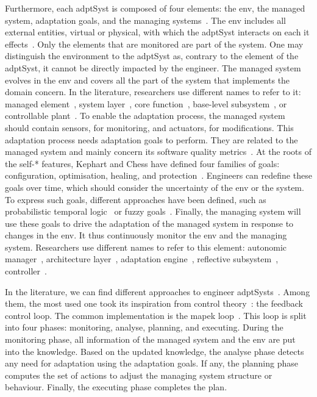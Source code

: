 Furthermore, each \gls{adptSyst} is composed of four elements: the \gls{env}, the managed system, adaptation goals, and the managing systems~\cite{DBLP:books/sp/19/Weyns19}.
The \gls{env} includes all external entities, virtual or physical, with which the \gls{adptSyst} interacts on each it effects~\cite{DBLP:journals/ansoft/Jackson97}.
Only the elements that are monitored are part of the system.
One may distinguish the environment to the \gls{adptSyst} as, contrary to the element of the \gls{adptSyst}, it cannot be directly impacted by the engineer.
The managed system evolves in the \gls{env} and covers all the part of the system that implements the domain concern.
In the literature, researchers use different names to refer to it: managed element~\cite{DBLP:journals/computer/KephartC03}, system layer~\cite{DBLP:journals/computer/GarlanCHSS04}, core function~\cite{DBLP:journals/taas/SalehieT09}, base-level subsystem~\cite{DBLP:journals/taas/WeynsMA12}, or controllable plant~\cite{DBLP:conf/icse/FilieriHM14}.
To enable the adaptation process, the managed system should contain sensors, for monitoring, and actuators, for modifications.
This adaptation process needs adaptation goals to perform.
They are related to the managed system and mainly concern its software quality metrics~\cite{DBLP:conf/ecsa/WeynsA13}.
At the roots of the self-* features, Kephart and Chess have defined four families of goals: configuration, optimisation, healing, and protection~\cite{DBLP:journals/computer/KephartC03}.  
Engineers can redefine these goals over time, which should consider the uncertainty of the \gls{env} or the system.
To express such goals, different approaches have been defined, such as probabilistic temporal logic~\cite{DBLP:journals/tse/CalinescuGKMT11} or fuzzy goals~\cite{DBLP:conf/re/BaresiPS10}.
Finally, the managing system will use these goals to drive the adaptation of the managed system in response to changes in the \gls{env}.
It thus continuously monitor the \gls{env} and the managing system.
Researchers use different names to refer to this element: autonomic manager~\cite{DBLP:journals/computer/KephartC03}, architecture layer~\cite{DBLP:journals/computer/GarlanCHSS04}, adaptation engine~\cite{DBLP:journals/taas/SalehieT09}, reflective subsystem~\cite{DBLP:journals/taas/WeynsMA12}, controller~\cite{DBLP:conf/icse/FilieriHM14}.

In the literature, we can find different approaches to engineer \glspl{adptSyst}~\cite{DBLP:journals/computer/GarlanCHSS04}.
Among them, the most used one took its inspiration from control theory~\cite{DBLP:conf/dagstuhl/BrunSGGKLMPS09}: the feedback control loop.
The common implementation is the \gls{mapek} loop~\cite{DBLP:journals/computer/KephartC03, computing2006architectural}.
This loop is split into four phases: monitoring, analyse, planning, and executing.
During the monitoring phase, all information of the managed system and the \gls{env} are put into the knowledge.
Based on the updated knowledge, the analyse phase detects any need for adaptation using the adaptation goals.
If any, the planning phase computes the set of actions to adjust the managing system structure or behaviour.
Finally, the executing phase completes the plan.

